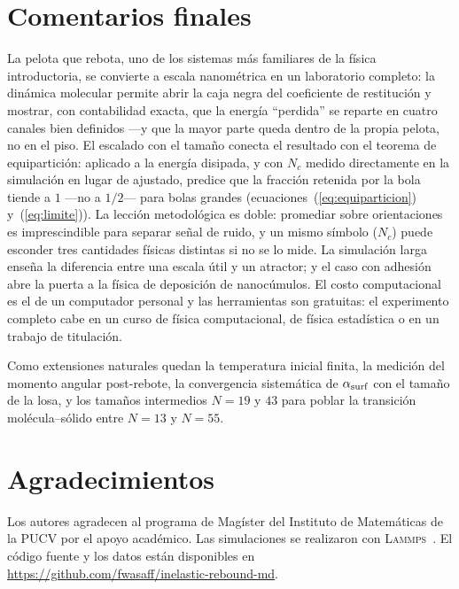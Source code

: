 \documentclass[10pt,a4paper,twocolumn]{article}
\newcommand{\lammps}{\textsc{Lammps}}
\begin{document}
\section{Comentarios finales}
\label{sec:conclusiones}

La pelota que rebota, uno de los sistemas más familiares de la física
introductoria, se convierte a escala nanométrica en un laboratorio
completo: la dinámica molecular permite abrir la caja negra del
coeficiente de restitución y mostrar, con contabilidad exacta, que la
energía ``perdida'' se reparte en cuatro canales bien definidos
---y que la mayor parte queda dentro de la propia pelota, no en el piso.
El escalado con el tamaño conecta el resultado con el teorema de
equipartición: aplicado a la energía disipada, y con $N_c$ medido
directamente en la simulación en lugar de ajustado, predice que la fracción
retenida por la bola tiende a $1$ ---no a $1/2$--- para bolas grandes
(ecuaciones~(\ref{eq:equiparticion}) y~(\ref{eq:limite})). La lección
metodológica es doble: promediar sobre orientaciones es imprescindible para
separar señal de ruido, y un mismo símbolo ($N_c$) puede esconder tres
cantidades físicas distintas si no se lo mide. La simulación larga enseña la
diferencia entre una escala útil y un atractor; y el caso con adhesión abre la
puerta a la física de deposición de nanocúmulos. El costo computacional es el
de un computador personal y las herramientas son gratuitas: el experimento
completo cabe en un curso de física computacional, de física estadística o en
un trabajo de titulación.

Como extensiones naturales quedan la temperatura inicial finita, la medición
del momento angular post-rebote, la convergencia sistemática de
$\alpha_{\rm surf}$ con el tamaño de la losa, y los tamaños intermedios $N=19$
y $43$ para poblar la transición molécula--sólido entre $N=13$ y $N=55$.

\section*{Agradecimientos}

Los autores agradecen al programa de Magíster del Instituto de Matemáticas
de la PUCV por el apoyo académico. Las simulaciones se realizaron con
\lammps{}~\cite{Thompson2022}. El código fuente y los datos están
disponibles en \url{https://github.com/fwasaff/inelastic-rebound-md}.
\end{document}
